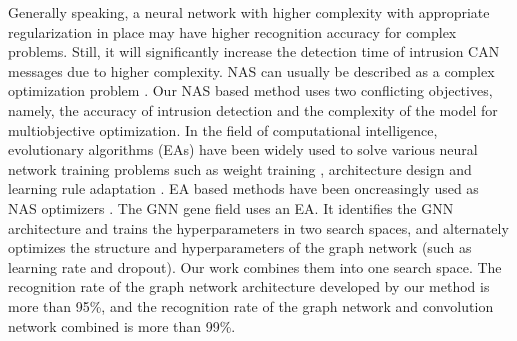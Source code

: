 \documentclass[lettersize,journal]{IEEEtran}
\begin{document}
Generally speaking, a neural network with higher complexity with appropriate regularization in place may have higher recognition accuracy for complex problems. Still, it will significantly increase the detection time of intrusion CAN messages due to higher complexity. NAS can usually be described as a complex optimization problem \cite{29, 31}. Our NAS based method uses two conflicting objectives, namely, the accuracy of intrusion detection and the complexity of the model for multiobjective optimization. In the field of computational intelligence, evolutionary algorithms (EAs) have been widely used to solve various neural network training problems such as weight training \cite{32}, architecture design \cite{33} and learning rule adaptation \cite{34}. EA based methods have been oncreasingly used as NAS optimizers \cite{35, 36, 37}. The GNN gene field \cite{26} uses an EA. It identifies the GNN architecture and trains the hyperparameters in two search spaces, and alternately optimizes the structure and hyperparameters of the graph network (such as learning rate and dropout). Our work combines them into one search space. The recognition rate of the graph network architecture developed by our method is more than 95\%, and the recognition rate of the graph network and convolution network combined is more than 99\%.
\end{document}
